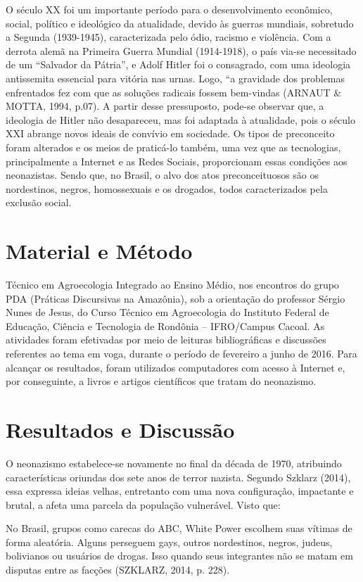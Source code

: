 \documentclass[article,12pt,onesidea,4paper,english,brazil]{abntex2}
\begin{document}
O século XX foi um importante período para o desenvolvimento econômico, social, político e ideológico da atualidade, devido às guerras mundiais, sobretudo a Segunda (1939-1945), caracterizada pelo ódio, racismo e violência.
Com a derrota alemã na Primeira Guerra Mundial (1914-1918), o país via-se necessitado de um “Salvador da Pátria”, e Adolf Hitler foi o consagrado, com uma ideologia antissemita essencial para vitória nas urnas. Logo, “a gravidade dos problemas enfrentados fez com que as soluções radicais fossem bem-vindas (ARNAUT \& MOTTA, 1994, p.07).
A partir desse pressuposto, pode-se observar que, a ideologia de Hitler não desapareceu, mas foi adaptada à atualidade, pois o século XXI abrange novos ideais de convívio em sociedade. Os tipos de preconceito foram alterados e os meios de praticá-lo também, uma vez que as tecnologias, principalmente a Internet e as Redes Sociais, proporcionam essas condições aos neonazistas. Sendo que, no Brasil, o alvo dos atos preconceituosos são os nordestinos, negros, homossexuais e os drogados, todos caracterizados pela exclusão social.
	
	\section*{Material e Método}
	
	Técnico em Agroecologia Integrado ao Ensino Médio, nos encontros do grupo PDA (Práticas Discursivas na Amazônia), sob a orientação do professor Sérgio Nunes de Jesus, do Curso Técnico em Agroecologia do Instituto Federal de Educação, Ciência e Tecnologia de Rondônia – IFRO/Campus Cacoal.
	As atividades foram efetivadas por meio de leituras bibliográficas e discussões referentes ao tema em voga, durante o período de fevereiro a junho de 2016. Para alcançar os resultados, foram utilizados computadores com acesso à Internet e, por conseguinte, a livros e artigos científicos que tratam do neonazismo.
	
	\section*{Resultados e Discussão}
	
	O neonazismo estabelece-se novamente no final da década de 1970, atribuindo características oriundas dos sete anos de terror nazista. Segundo Szklarz (2014), essa expressa ideias velhas, entretanto com uma nova configuração, impactante e brutal, a afeta uma parcela da população vulnerável. Visto que: 
	
	\begin{citacao}
		No Brasil, grupos como carecas do ABC, White Power escolhem suas vítimas de forma aleatória. Alguns perseguem gays, outros nordestinos, negros, judeus, bolivianos ou usuários de drogas. Isso quando seus integrantes não se matam em disputas entre as facções (SZKLARZ, 2014, p. 228).
	\end{citacao}
	
\end{document}
